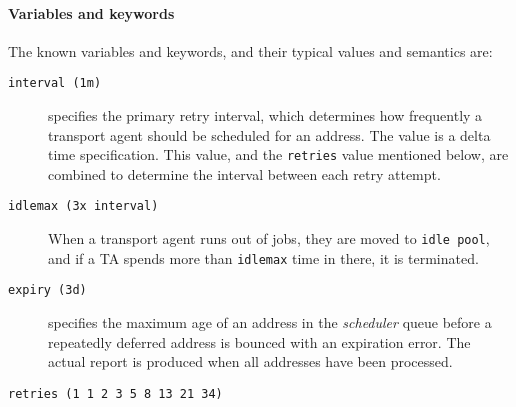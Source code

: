 \paragraph{Variables and keywords}

The known variables and keywords, and their typical values and semantics are:
\begin{description}
\item[{\tt interval (1m)}] \mbox{}

specifies the primary retry interval, which 
determines how frequently a transport agent should be scheduled for an address. 
The value is a delta time specification. This value, and the {\tt retries}
value mentioned below, are combined to determine the interval between
each retry attempt.



\item[{\tt idlemax (3x interval)}] \mbox{}

When a transport agent runs out of jobs, 
they are moved to {\tt idle pool}, and if a TA spends more than 
{\tt idlemax} time in there, it is terminated.



\item[{\tt expiry (3d)}] \mbox{}

specifies the maximum age of an address in the 
{\em scheduler\/} queue before a repeatedly deferred address is bounced 
with an expiration error. The actual report is produced when all addresses 
have been processed.



\item[{\tt retries (1 1 2 3 5 8 13 21 34)}] \mbox{}


\end{description}
